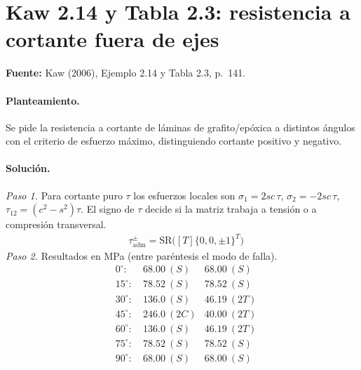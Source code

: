 \documentclass[11pt]{article}
\begin{document}
\clearpage
\section{Kaw 2.14 y Tabla 2.3: resistencia a cortante fuera de ejes}\label{ej:kaw_2_14}
\textbf{Fuente:} Kaw (2006), Ejemplo 2.14 y Tabla 2.3, p.~141.

\paragraph{Planteamiento.} Se pide la resistencia a cortante de láminas de grafito/epóxica a distintos ángulos con el criterio de esfuerzo máximo, distinguiendo cortante positivo y negativo.

\paragraph{Solución.}
\begin{center}\end{center}

\textit{Paso 1.} Para cortante puro $\tau$ los esfuerzos locales son $\sigma_1=2sc\,\tau$, $\sigma_2=-2sc\,\tau$, $\tau_{12}=(c^2-s^2)\tau$. El signo de $\tau$ decide si la matriz trabaja a tensión o a compresión transversal.
\begin{align*}
&\tau_{\text{adm}}^{\pm}=\mathrm{SR}\big([T]\{0,0,\pm1\}^T\big)
\end{align*}
\textit{Paso 2.} Resultados en MPa (entre paréntesis el modo de falla).
\begin{align*}
&0^\circ: & \ 68.00\ (S) & 68.00\ (S) \\ &15^\circ: & \ 78.52\ (S) & 78.52\ (S) \\ &30^\circ: & \ 136.0\ (S) & 46.19\ (2T) \\ &45^\circ: & \ 246.0\ (2C) & 40.00\ (2T) \\ &60^\circ: & \ 136.0\ (S) & 46.19\ (2T) \\ &75^\circ: & \ 78.52\ (S) & 78.52\ (S) \\ &90^\circ: & \ 68.00\ (S) & 68.00\ (S)
\end{align*}
\end{document}
